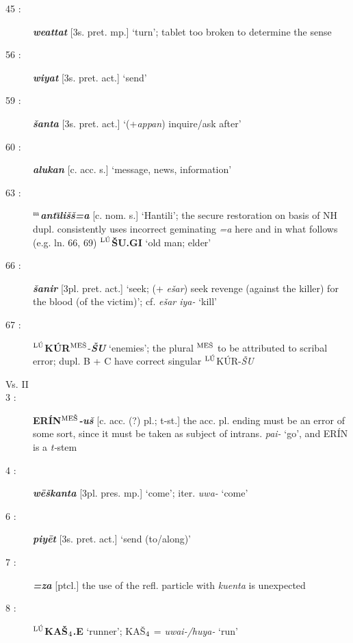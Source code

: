 \documentclass[10pt]{article}
\newcommand{\supersc}[1]{$^{\textrm{\scriptsize{#1}}}$}  	%
\newcommand{\subsc}[1]{$_{\textrm{\scriptsize{#1}}}$}	%
\newcommand{\bit}[1]{\textbf{\textit{#1}}}				%
\newcommand{\p}[1]{{\tiny[{#1}]}}					%
\newcommand{\I}{\={\i}}									%
\newcommand{\hith}{\textsubwedge{h}}
\newcommand{\Hith}{\textsubwedge{H}}
\newcommand{\man}{\supersc{L\'U}}
\newcommand{\mpl}{\supersc{ME\v{S}}}
\renewcommand{\.}[1]{\textsubdot{#1}}
\begin{document}
\begin{description}
\item[45 :] \bit{we{\hith}attat} \p{3s. pret. mp.} `turn'; tablet too broken to determine the sense

\item[56 :] \bit{wiyat} \p{3s. pret. act.} `send'

\item[59 :] \bit{\v{s}an{\hith}ta} \p{3s. pret. act.} `(+\textit{appan}) inquire/ask after'

\item[60 :] \bit{{\hith}alukan} \p{c. acc. s.} `message, news, information'

\item[63 :] \textbf{\supersc{m}}\bit{{\Hith}ant{\I}li\v{s}\v{s}=a} \p{c. nom. s.} `Hantili';  the secure restoration on basis of NH dupl. consistently uses incorrect geminating \textit{=a} here and in what follows (e.g. ln. 66, 69) \textbf{{\man}\v{S}U.GI} `old man; elder'

\item[66 :] \bit{\v{s}an{\hith}ir} \p{3pl. pret. act.} `seek; (+ \textit{e\v{s}{\hith}ar}) seek revenge (against the killer) for the blood (of the victim)'; cf. \textit{e\v{s}{\hith}ar iya-} `kill'

\item[67 :] \textbf{{\man}K\'UR{\mpl}}-\bit{\v{S}U} `enemies'; the plural {\mpl} to be attributed to scribal error; dupl. B + C have correct singular {\man}K\'UR-\textit{\v{S}U}

\smallskip

\item[Vs. II]

\smallskip

\item[3 :] \textbf{ER\'IN{\mpl}}\bit{-u\v{s}} \p{c. acc. (?) pl.; t-st.} the acc. pl. ending must be an error of some sort, since it must be taken as subject of intrans. \textit{pai-} `go', and ER\'IN is a \textit{t-}stem

\item[4 :] \bit{w\=e\v{s}kanta} \p{3pl. pres. mp.} `come'; iter. \textit{uwa-} `come'

\item[6 :] \bit{piy\=et} \p{3s. pret. act.} `send (to/along)'

\item[7 :] \bit{=za} \p{ptcl.} the use of the refl. particle with \textit{kuenta} is unexpected

\item[8 :] \textbf{{\man}KA\v{S}\subsc{4}.E} `runner'; KA\v{S}\subsc{4} = \textit{{\hith}uwai-/huya-} `run'


\end{description}
\end{document}
